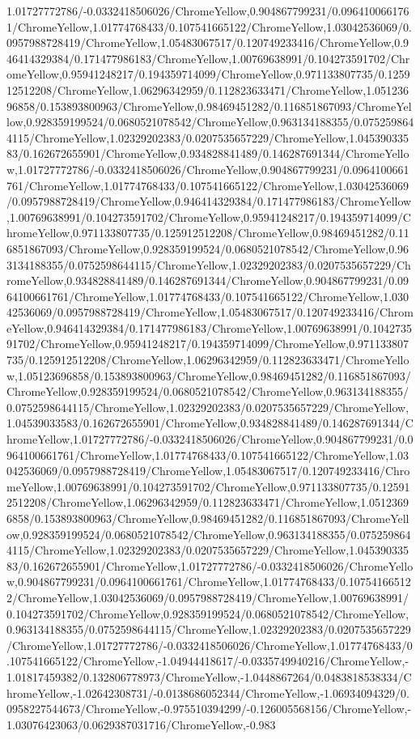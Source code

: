 {\begin{tikzternal}
{1.01727772786/-0.0332418506026/ChromeYellow,0.904867799231/0.0964100661761/ChromeYellow,1.01774768433/0.107541665122/ChromeYellow,1.03042536069/0.0957988728419/ChromeYellow,1.05483067517/0.120749233416/ChromeYellow,0.946414329384/0.171477986183/ChromeYellow,1.00769638991/0.104273591702/ChromeYellow,0.95941248217/0.194359714099/ChromeYellow,0.971133807735/0.125912512208/ChromeYellow,1.06296342959/0.112823633471/ChromeYellow,1.05123696858/0.153893800963/ChromeYellow,0.98469451282/0.116851867093/ChromeYellow,0.928359199524/0.0680521078542/ChromeYellow,0.963134188355/0.0752598644115/ChromeYellow,1.02329202383/0.0207535657229/ChromeYellow,1.04539033583/0.162672655901/ChromeYellow,0.934828841489/0.146287691344/ChromeYellow,1.01727772786/-0.0332418506026/ChromeYellow,0.904867799231/0.0964100661761/ChromeYellow,1.01774768433/0.107541665122/ChromeYellow,1.03042536069/0.0957988728419/ChromeYellow,0.946414329384/0.171477986183/ChromeYellow,1.00769638991/0.104273591702/ChromeYellow,0.95941248217/0.194359714099/ChromeYellow,0.971133807735/0.125912512208/ChromeYellow,0.98469451282/0.116851867093/ChromeYellow,0.928359199524/0.0680521078542/ChromeYellow,0.963134188355/0.0752598644115/ChromeYellow,1.02329202383/0.0207535657229/ChromeYellow,0.934828841489/0.146287691344/ChromeYellow,0.904867799231/0.0964100661761/ChromeYellow,1.01774768433/0.107541665122/ChromeYellow,1.03042536069/0.0957988728419/ChromeYellow,1.05483067517/0.120749233416/ChromeYellow,0.946414329384/0.171477986183/ChromeYellow,1.00769638991/0.104273591702/ChromeYellow,0.95941248217/0.194359714099/ChromeYellow,0.971133807735/0.125912512208/ChromeYellow,1.06296342959/0.112823633471/ChromeYellow,1.05123696858/0.153893800963/ChromeYellow,0.98469451282/0.116851867093/ChromeYellow,0.928359199524/0.0680521078542/ChromeYellow,0.963134188355/0.0752598644115/ChromeYellow,1.02329202383/0.0207535657229/ChromeYellow,1.04539033583/0.162672655901/ChromeYellow,0.934828841489/0.146287691344/ChromeYellow,1.01727772786/-0.0332418506026/ChromeYellow,0.904867799231/0.0964100661761/ChromeYellow,1.01774768433/0.107541665122/ChromeYellow,1.03042536069/0.0957988728419/ChromeYellow,1.05483067517/0.120749233416/ChromeYellow,1.00769638991/0.104273591702/ChromeYellow,0.971133807735/0.125912512208/ChromeYellow,1.06296342959/0.112823633471/ChromeYellow,1.05123696858/0.153893800963/ChromeYellow,0.98469451282/0.116851867093/ChromeYellow,0.928359199524/0.0680521078542/ChromeYellow,0.963134188355/0.0752598644115/ChromeYellow,1.02329202383/0.0207535657229/ChromeYellow,1.04539033583/0.162672655901/ChromeYellow,1.01727772786/-0.0332418506026/ChromeYellow,0.904867799231/0.0964100661761/ChromeYellow,1.01774768433/0.107541665122/ChromeYellow,1.03042536069/0.0957988728419/ChromeYellow,1.00769638991/0.104273591702/ChromeYellow,0.928359199524/0.0680521078542/ChromeYellow,0.963134188355/0.0752598644115/ChromeYellow,1.02329202383/0.0207535657229/ChromeYellow,1.01727772786/-0.0332418506026/ChromeYellow,1.01774768433/0.107541665122/ChromeYellow,-1.04944418617/-0.0335749940216/ChromeYellow,-1.01817459382/0.132806778973/ChromeYellow,-1.0448867264/0.0483818538334/ChromeYellow,-1.02642308731/-0.0138686052344/ChromeYellow,-1.06934094329/0.0958227544673/ChromeYellow,-0.975510394299/-0.126005568156/ChromeYellow,-1.03076423063/0.0629387031716/ChromeYellow,-0.983}
\end{tikzternal}}
